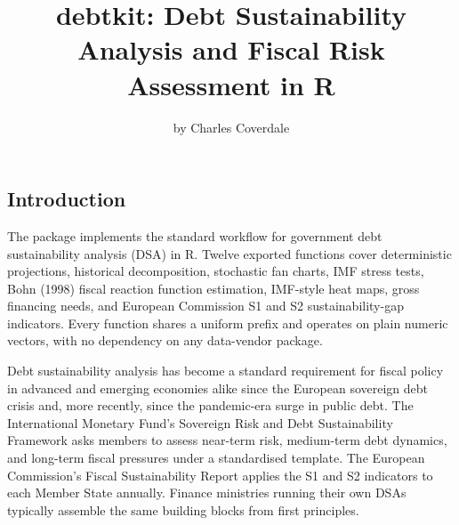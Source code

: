 \title{debtkit: Debt Sustainability Analysis and Fiscal Risk Assessment
in R}
\author{by Charles Coverdale}

\maketitle


\subsection{Introduction}\label{introduction}

The  package implements the standard workflow for
government debt sustainability analysis (DSA) in R. Twelve exported
functions cover deterministic projections, historical decomposition,
stochastic fan charts, IMF stress tests, Bohn (1998) fiscal reaction
function estimation, IMF-style heat maps, gross financing needs, and
European Commission S1 and S2 sustainability-gap indicators. Every
function shares a uniform  prefix and operates on plain
numeric vectors, with no dependency on any data-vendor package.

Debt sustainability analysis has become a standard requirement for
fiscal policy in advanced and emerging economies alike since the
European sovereign debt crisis and, more recently, since the
pandemic-era surge in public debt. The International Monetary Fund's
Sovereign Risk and Debt Sustainability Framework \citep{imf2022} asks
members to assess near-term risk, medium-term debt dynamics, and
long-term fiscal pressures under a standardised template. The European
Commission's Fiscal Sustainability Report applies the S1 and S2
indicators \citep{ec2024fsr} to each Member State annually. Finance
ministries running their own DSAs typically assemble the same building
blocks from first principles.

